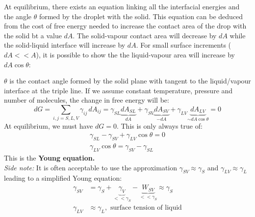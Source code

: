 \documentclass[a4paper, 11pt, normalem]{report}
\begin{document}
At equilibrium, there exists an equation linking all the interfacial energies and the angle $\theta$ formed by the droplet with the solid.
This equation can be deduced from the cost of free energy needed to increase the contact area of the drop with the solid bt a value $dA$.
The solid-vapour contact area will decrease by $dA$ while the solid-liquid interface will increase by $dA$.
For small surface increments ($dA << A$), it is possible to show the the liquid-vapour area will increase by $dA\cos\theta$:
\begin{figure}[H]
    \centering
\end{figure}
$\theta$ is the contact angle formed by the solid plane with tangent to the liquid/vapour interface at the triple line.
If we assume constant temperature, pressure and number of molecules, the change in free energy will be:
\begin{equation}
    dG = \sum_{i,j=S,L,V} \gamma_{ij}\,dA_{ij} = \gamma_{SL}\underbrace{dA_{SL}}_{dA} + \gamma_{SV}\underbrace{dA_{SV}}_{-dA} + \gamma_{LV}\underbrace{dA_{LV}}_{\sim dA\cos\theta} = 0
\end{equation}
At equilibrium, we must have $dG = 0$.
This is only always true of:
\begin{align}
    \gamma_{SL} - \gamma_{SV} + \gamma_{LV}\cos\theta = 0 \\
    \gamma_{LV}\cos\theta = \gamma_{SV} - \gamma_{SL}
\end{align}
This is the \textbf{Young equation.}\\
\textit{Side note:} It is often acceptable to use the approximation $\gamma_{SV} \approx \gamma_S$ and $\gamma_{LV} \approx \gamma_L$ leading to a simplified Young equation:
\begin{align}
    \gamma_{SV} &= \gamma_S + \underbrace{\gamma_V}_{<<\gamma_S} - \underbrace{W_{SV}}_{<<\gamma_S} \approx \gamma_S \\
    \gamma_{LV} &\approx \gamma_L,\text{ surface tension of liquid}
\end{align}
\end{document}
